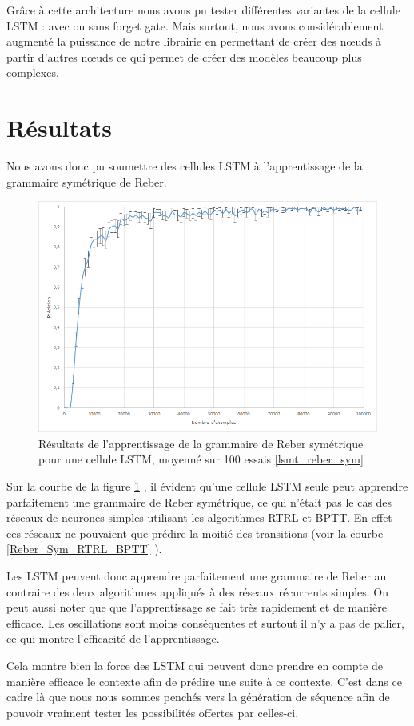 Grâce à cette architecture nous avons pu tester différentes variantes de la cellule LSTM : avec ou sans forget gate. Mais surtout, nous avons considérablement augmenté la puissance de notre librairie en permettant de créer des n\oe{}uds à partir d'autres n\oe{}uds ce qui permet de créer des modèles beaucoup plus complexes.

\section{Résultats}

Nous avons donc pu soumettre des cellules LSTM à l'apprentissage de la grammaire symétrique de Reber. 

\begin{figure}[h!]
\begin{center}
\includegraphics[scale=0.5]{images/chapter6/LSTM_Reber_Sym.png}
\caption{Résultats de l'apprentissage de la grammaire de Reber symétrique pour une cellule LSTM, moyenné sur 100 essais
\ref{lsmt_reber_sym}}
\label{Reber_Sym_LSTM}
\end{center}
\end{figure}

Sur la courbe de la figure \ref{Reber_Sym_LSTM} , il évident qu'une cellule LSTM seule peut apprendre parfaitement une grammaire de Reber symétrique, ce qui n'était pas le cas des réseaux de neurones simples utilisant les algorithmes RTRL et BPTT. En effet ces réseaux ne pouvaient que prédire la moitié des transitions (voir la courbe \ref{Reber_Sym_RTRL_BPTT} ).

Les LSTM peuvent donc apprendre parfaitement une grammaire de Reber au contraire des deux algorithmes appliqués à des réseaux récurrents simples. On peut aussi noter que que l'apprentissage se fait très rapidement et de manière efficace. Les oscillations sont moins conséquentes et surtout il n'y a pas de palier, ce qui montre l'efficacité de l'apprentissage.


Cela montre bien la force des LSTM qui peuvent donc prendre en compte de manière efficace le contexte afin de prédire une suite à ce contexte. C'est dans ce cadre là que nous nous sommes penchés vers la génération de séquence afin de pouvoir vraiment tester les possibilités offertes par celles-ci.